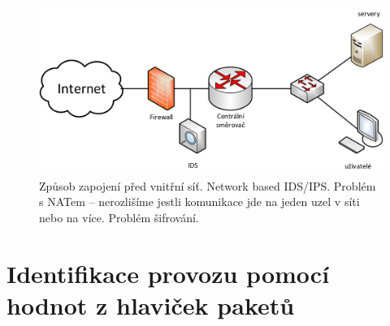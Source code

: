 \begin{figure}[H]
    \centering
    \includegraphics[width=0.75\linewidth]{zpusob_zapojeni_2.png}
    \caption{Způsob zapojení před vnitřní síť. Network based IDS/IPS. Problém s NATem -- nerozlišíme jestli komunikace jde na jeden uzel v síti nebo na více. Problém šifrování.}
\end{figure}


\section{Identifikace provozu pomocí hodnot z hlaviček paketů}

